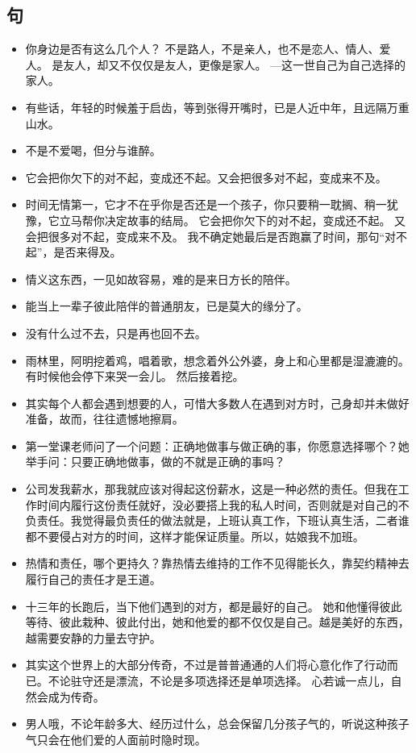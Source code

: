 \documentclass[UTF8,a4paper,8pt]{ctexart}
\begin{document}
 \subsection{句}
 \begin{itemize}
 	\item 你身边是否有这么几个人？ 不是路人，不是亲人，也不是恋人、情人、爱人。 是友人，却又不仅仅是友人，更像是家人。 —这一世自己为自己选择的家人。
 	\item 有些话，年轻的时候羞于启齿，等到张得开嘴时，已是人近中年，且远隔万重山水。
 	\item 不是不爱喝，但分与谁醉。
 	\item 它会把你欠下的对不起，变成还不起。又会把很多对不起，变成来不及。
 	\item 时间无情第一，它才不在乎你是否还是一个孩子，你只要稍一耽搁、稍一犹豫，它立马帮你决定故事的结局。 它会把你欠下的对不起，变成还不起。 又会把很多对不起，变成来不及。 我不确定她最后是否跑赢了时间，那句“对不起”，是否来得及。
 	\item 情义这东西，一见如故容易，难的是来日方长的陪伴。
 	\item 能当上一辈子彼此陪伴的普通朋友，已是莫大的缘分了。
 	\item 没有什么过不去，只是再也回不去。
 	\item 雨林里，阿明挖着鸡，唱着歌，想念着外公外婆，身上和心里都是湿漉漉的。 有时候他会停下来哭一会儿。 然后接着挖。
 	\item 其实每个人都会遇到想要的人，可惜大多数人在遇到对方时，己身却并未做好准备，故而，往往遗憾地擦肩。
 	\item 第一堂课老师问了一个问题：正确地做事与做正确的事，你愿意选择哪个？她举手问：只要正确地做事，做的不就是正确的事吗？ 
 	\item 公司发我薪水，那我就应该对得起这份薪水，这是一种必然的责任。但我在工作时间内履行这份责任就好，没必要搭上我的私人时间，否则就是对自己的不负责任。我觉得最负责任的做法就是，上班认真工作，下班认真生活，二者谁都不要侵占对方的时间，这样才能保证质量。所以，姑娘我不加班。
 	\item 热情和责任，哪个更持久？靠热情去维持的工作不见得能长久，靠契约精神去履行自己的责任才是王道。
 	\item 十三年的长跑后，当下他们遇到的对方，都是最好的自己。 她和他懂得彼此等待、彼此栽种、彼此付出，她和他爱的都不仅仅是自己。越是美好的东西，越需要安静的力量去守护。
 	\item 其实这个世界上的大部分传奇，不过是普普通通的人们将心意化作了行动而已。不论驻守还是漂流，不论是多项选择还是单项选择。 心若诚一点儿，自然会成为传奇。
 	\item 男人哦，不论年龄多大、经历过什么，总会保留几分孩子气的，听说这种孩子气只会在他们爱的人面前时隐时现。

\end{itemize}
\end{document}

